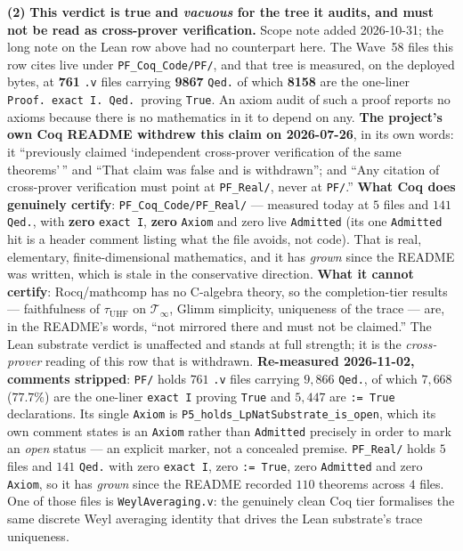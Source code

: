 \begin{footnotesize}
\noindent\textbf{(2)} \textbf{This verdict is true and
\emph{vacuous} for the tree it audits, and must not be read as cross-prover
verification.} Scope note added 2026-10-31; the long note on the Lean row above
had no counterpart here. The Wave~58 files this row cites live under
\texttt{PF\_Coq\_Code/PF/}, and that tree is measured, on the deployed bytes, at
\textbf{761} \texttt{.v} files carrying \textbf{9867} \texttt{Qed.} of which
\textbf{8158} are the one-liner \texttt{Proof.\ exact I.\ Qed.}\ proving
\texttt{True}. An axiom audit of such a proof reports no axioms because there is
no mathematics in it to depend on any. \textbf{The project's own Coq README
withdrew this claim on 2026-07-26}, in its own words: it ``previously claimed
`independent cross-prover verification of the same theorems'\,'' and ``That
claim was false and is withdrawn''; and ``Any citation of cross-prover
verification must point at \texttt{PF\_Real/}, never at \texttt{PF/}.'' \textbf{What
Coq does genuinely certify}: \texttt{PF\_Coq\_Code/PF\_Real/} --- measured today
at $5$ files and $141$ \texttt{Qed.}, with \textbf{zero} \texttt{exact I},
\textbf{zero} \texttt{Axiom} and zero live \texttt{Admitted} (its one
\texttt{Admitted} hit is a header comment listing what the file avoids, not
code). That is real, elementary, finite-dimensional mathematics, and it has
\emph{grown} since the README was written, which is stale in the conservative
direction. \textbf{What it cannot certify}: Rocq/mathcomp has no
C\*-algebra theory, so the completion-tier results --- faithfulness of
$\tau_{\mathrm{UHF}}$ on $\mathcal{T}_\infty$, Glimm simplicity, uniqueness of
the trace --- are, in the README's words, ``not mirrored there and must not be
claimed.'' The Lean substrate verdict is unaffected and stands at full strength;
it is the \emph{cross-prover} reading of this row that is withdrawn. \textbf{Re-measured 2026-11-02, comments stripped}:
\texttt{PF/} holds $761$ \texttt{.v} files carrying $9{,}866$ \texttt{Qed.}, of
which $7{,}668$ ($77.7\%$) are the one-liner \texttt{exact I} proving
\texttt{True} and $5{,}447$ are \texttt{:= True} declarations. Its single
\texttt{Axiom} is
\texttt{P5\_holds\_\allowbreak{}LpNat\allowbreak{}Substrate\_\allowbreak{}is\_\allowbreak{}open},
which its own comment states is an \texttt{Axiom} rather than \texttt{Admitted}
precisely in order to mark an \emph{open} status --- an explicit marker, not a
concealed premise. \texttt{PF\_Real/} holds $5$ files and $141$ \texttt{Qed.}
with zero \texttt{exact I}, zero \texttt{:= True}, zero \texttt{Admitted} and
zero \texttt{Axiom}, so it has \emph{grown} since the README recorded $110$
theorems across $4$ files. One of those files is \texttt{WeylAveraging.v}: the
genuinely clean Coq tier formalises the same discrete Weyl averaging identity
that drives the Lean substrate's trace uniqueness.
\end{footnotesize}


